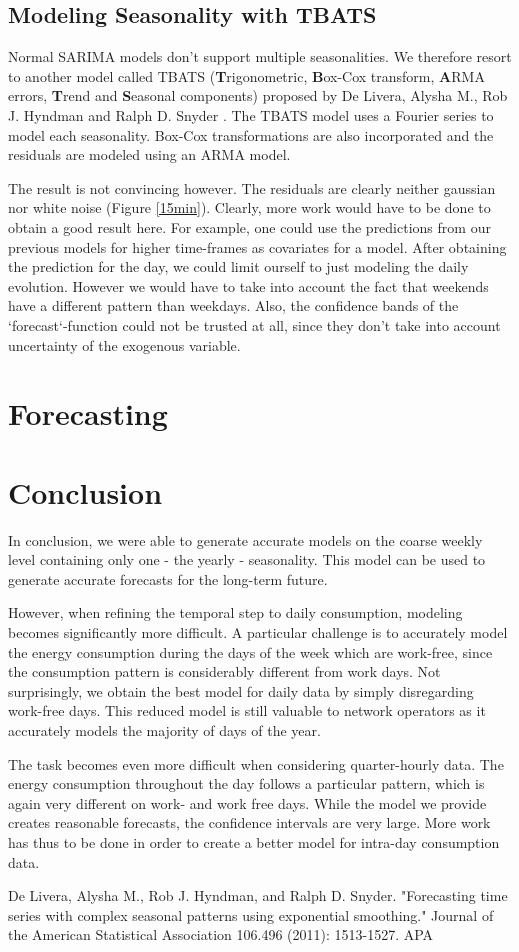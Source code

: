 \documentclass[conference]{IEEEtran}
\begin{document}
\subsection{Modeling Seasonality with TBATS}
Normal SARIMA models don’t support multiple seasonalities. We therefore resort to another model called TBATS (\textbf{T}rigonometric, \textbf{B}ox-Cox transform, \textbf{A}RMA errors, \textbf{T}rend and \textbf{S}easonal components) proposed by De Livera, Alysha M., Rob J. Hyndman and Ralph D. Snyder \cite{TBATS_paper}. The TBATS model uses a Fourier series to model each seasonality. Box-Cox transformations are also incorporated and the residuals are modeled using an ARMA model.
\par
The result is not convincing however. The residuals are clearly neither gaussian nor white noise (Figure \ref{15min}). Clearly, more work would have to be done to obtain a good result here. For example, one could use the predictions from our previous models for higher time-frames as covariates for a model. After obtaining the prediction for the day, we could limit ourself to just modeling the daily evolution. However we would have to take into account the fact that weekends have a different pattern than weekdays. Also, the confidence bands  of the `forecast`-function could not be trusted at all, since they don’t take into account uncertainty of the exogenous variable.

\section{Forecasting}


\section{Conclusion}
In conclusion, we were able to generate accurate models on the coarse weekly level containing only one - the yearly - seasonality. This model can be used to generate accurate forecasts for the long-term future. 
\par
However, when refining the temporal step to daily consumption, modeling becomes significantly more difficult. A particular challenge is to accurately model the energy consumption during the days of the week which are work-free, since the consumption pattern is considerably different from work days. Not surprisingly, we obtain the best model for daily data by simply disregarding work-free days. This reduced model is still valuable to network operators as it accurately models the majority of days of the year.
\par
The task becomes even more difficult when considering quarter-hourly data. The energy consumption throughout the day follows a particular pattern, which is again very different on work- and work free days. While the model we provide creates reasonable forecasts, the confidence intervals are very large. More work has thus to be done in order to create a better model for intra-day consumption data.
\par



\begin{thebibliography}{00}

De Livera, Alysha M., Rob J. Hyndman, and Ralph D. Snyder. "Forecasting time series with complex seasonal patterns using exponential smoothing." Journal of the American Statistical Association 106.496 (2011): 1513-1527.
APA	

\end{thebibliography}
\end{document}
